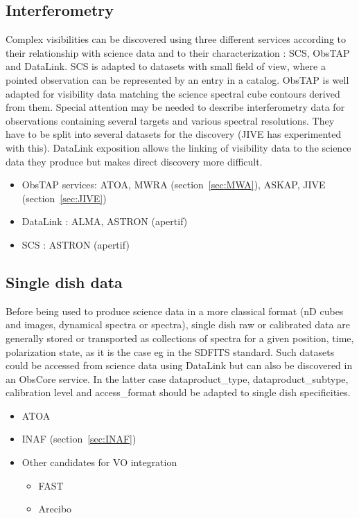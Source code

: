 \documentclass[11pt,a4paper]{ivoa}
\begin{document}
\subsection{Interferometry}
Complex visibilities can be discovered using three different services according to their relationship with science data and to their characterization : SCS, ObsTAP and DataLink. SCS is adapted to datasets with small field of view, where a pointed observation can be
represented by an entry in a catalog. ObsTAP is well adapted for visibility data matching the science spectral cube contours derived from them. Special attention may be needed to describe interferometry data for observations containing several targets and various spectral resolutions. They have to be split into several datasets for the discovery (JIVE has experimented with this). DataLink exposition allows the linking of visibility data to the science data they produce but makes direct discovery more difficult. 
\begin{itemize}
\item ObsTAP services: ATOA, MWRA (section~\ref{sec:MWA}), ASKAP, JIVE (section~\ref{sec:JIVE})
\item DataLink : ALMA, ASTRON (apertif)
\item SCS : ASTRON (apertif)
\end{itemize}
\subsection{Single dish data}
Before being used to produce science data in a more classical format (nD cubes and images, dynamical spectra or spectra),  single dish  raw or calibrated data are generally stored or transported as collections of spectra for a given position, time, polarization state, as it is the case eg in the SDFITS standard. Such datasets could be accessed from science data using DataLink but can also be discovered in an ObsCore service. In the latter case dataproduct\_type, dataproduct\_subtype, calibration level and access\_format should be adapted to single dish specificities.
\begin{itemize}
\item ATOA 
\item INAF (section~\ref{sec:INAF})
\item Other candidates for VO integration
\begin{itemize}
\item  FAST
\item Arecibo
\end{itemize}
\end{itemize}
\end{document}
